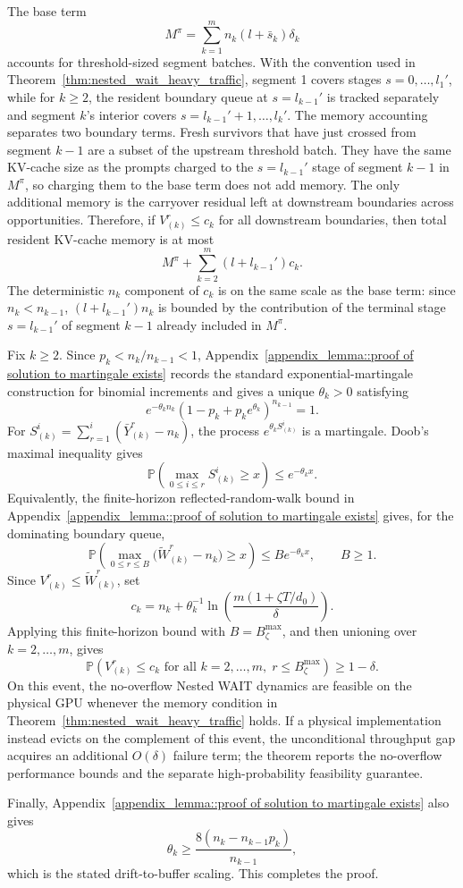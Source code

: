 The base term
\[
    M^\pi=\sum_{k=1}^m n_k(l+\bar s_k)\delta_k
\]
accounts for threshold-sized segment batches. With the convention used in Theorem~\ref{thm:nested_wait_heavy_traffic}, segment 1 covers stages \(s=0,\ldots,l_1'\), while for \(k\ge2\), the resident boundary queue at \(s=l_{k-1}'\) is tracked separately and segment \(k\)'s interior covers \(s=l_{k-1}'+1,\ldots,l_k'\). The memory accounting separates two boundary terms. Fresh survivors that have just crossed from segment \(k-1\) are a subset of the upstream threshold batch. They have the same KV-cache size as the prompts charged to the \(s=l_{k-1}'\) stage of segment \(k-1\) in \(M^\pi\), so charging them to the base term does not add memory. The only additional memory is the carryover residual left at downstream boundaries across opportunities. Therefore, if \(V^r_{(k)}\le c_k\) for all downstream boundaries, then total resident KV-cache memory is at most
\[
    M^\pi+\sum_{k=2}^m(l+l_{k-1}')c_k .
\]
The deterministic \(n_k\) component of \(c_k\) is on the same scale as the base term: since \(n_k<n_{k-1}\), \((l+l_{k-1}')n_k\) is bounded by the contribution of the terminal stage \(s=l_{k-1}'\) of segment \(k-1\) already included in \(M^\pi\).

Fix \(k\ge2\). Since \(p_k<n_k/n_{k-1}<1\), Appendix~\ref{appendix_lemma::proof of solution to martingale exists} records the standard exponential-martingale construction for binomial increments and gives a unique \(\theta_k>0\) satisfying
\[
    e^{-\theta_k n_k}(1-p_k+p_ke^{\theta_k})^{n_{k-1}}=1.
\]
For \(S^i_{(k)}=\sum_{r=1}^i(\bar Y^r_{(k)}-n_k)\), the process \(e^{\theta_k S^i_{(k)}}\) is a martingale. Doob's maximal inequality \citep[see, e.g.,][]{durrett2019probability} gives
\[
    \mathbb{P}\!\left(\max_{0\le i\le r}S^i_{(k)}\ge x\right)\le e^{-\theta_k x}.
\]
Equivalently, the finite-horizon reflected-random-walk bound in Appendix~\ref{appendix_lemma::proof of solution to martingale exists} gives, for the dominating boundary queue,
\[
    \mathbb{P}\!\left(
    \max_{0\le r\le B}\big(\widetilde W^r_{(k)}-n_k\big)\ge x
    \right)
    \le B e^{-\theta_k x},\qquad B\ge1.
\]
Since \(V^r_{(k)}\le \widetilde W^r_{(k)}\), set
\[
    c_k
    =
    n_k+\theta_k^{-1}
    \ln\!\left(\frac{m(1+\zeta T/d_0)}{\delta}\right).
\]
Applying this finite-horizon bound with \(B=B_\zeta^{\max}\), and then unioning over \(k=2,\ldots,m\), gives
\[
    \mathbb{P}\!\left(
    V^r_{(k)}\le c_k
    \text{ for all } k=2,\ldots,m,\; r\le B_\zeta^{\max}
    \right)\ge1-\delta.
\]
On this event, the no-overflow Nested WAIT dynamics are feasible on the physical GPU whenever the memory condition in Theorem~\ref{thm:nested_wait_heavy_traffic} holds. If a physical implementation instead evicts on the complement of this event, the unconditional throughput gap acquires an additional \(O(\delta)\) failure term; the theorem reports the no-overflow performance bounds and the separate high-probability feasibility guarantee.

Finally, Appendix~\ref{appendix_lemma::proof of solution to martingale exists} also gives
\[
    \theta_k\ge \frac{8(n_k-n_{k-1}p_k)}{n_{k-1}},
\]
which is the stated drift-to-buffer scaling. This completes the proof.
